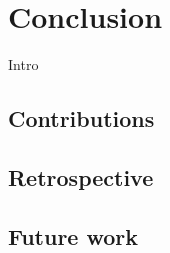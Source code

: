 \chapter{Conclusion}\label{cha:conclusion}
Intro

\section{Contributions}
\section{Retrospective}
\section{Future work}
